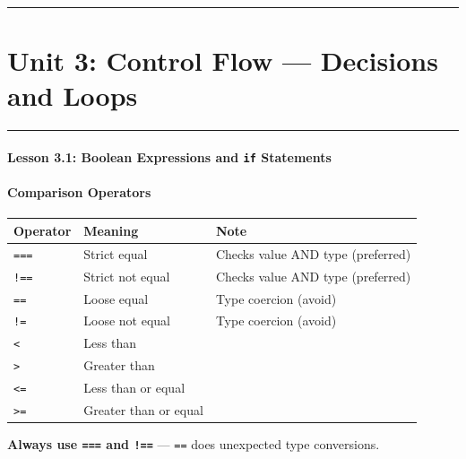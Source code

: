 \documentclass[
  justified,
  openright,
]{tufte-book}
\let\subsection\paragraph
\let\paragraph\paragraph
\let\subsection\paragraph
\let\paragraph\paragraph
\begin{document}
\begin{center}\rule{0.5\linewidth}{0.5pt}\end{center}

\section{Unit 3: Control Flow --- Decisions and
Loops}\label{unit-3-control-flow-decisions-and-loops-2}

\begin{center}\rule{0.5\linewidth}{0.5pt}\end{center}

\subsection{\texorpdfstring{Lesson 3.1: Boolean Expressions and
\texttt{if}
Statements}{Lesson 3.1: Boolean Expressions and if Statements}}\label{lesson-3.1-boolean-expressions-and-if-statements-1}

\subsection{Comparison Operators}\label{comparison-operators}

\begin{fullwidth}{\def\LTcaptype{none} %
\begin{longtable}[]{@{}lll@{}}
\toprule\noalign{}
Operator & Meaning & Note \\
\midrule\noalign{}
\endhead
\bottomrule\noalign{}
\endlastfoot
\texttt{===} & Strict equal & Checks value AND type (preferred) \\
\texttt{!==} & Strict not equal & Checks value AND type (preferred) \\
\texttt{==} & Loose equal & Type coercion (avoid) \\
\texttt{!=} & Loose not equal & Type coercion (avoid) \\
\texttt{\textless{}} & Less than & \\
\texttt{\textgreater{}} & Greater than & \\
\texttt{\textless{}=} & Less than or equal & \\
\texttt{\textgreater{}=} & Greater than or equal & \\
\end{longtable}
}
\end{fullwidth}

\textbf{Always use \texttt{===} and \texttt{!==}} --- \texttt{==} does
unexpected type conversions.
\end{document}
